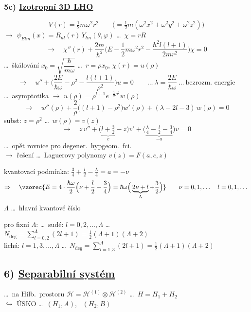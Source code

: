 \subsubsection*{5c) \underline{Izotropní 3D LHO}}
\[
  V(r) = \tfrac12 m\omega^2r^2 \qquad \big(= \tfrac12m(\omega^2x^2 + \omega^2y^2 + \omega^2z^2)\big)
\]
$\to$ \quad $\psi_{Elm}(x) = R_{nl}(r)\,Y_{lm}(\theta,\varphi)$ \quad \dots\ $\chi = rR$
\[
  \to\quad \chi''(r) + \frac{2m}{\hbar^2}\Big(E - \frac12m\omega^2r^2 - \frac{\hbar^2l(l+1)}{2mr^2}\Big)\chi = 0
\]
\quad \dots\ škálování \quad $x_0 = \sqrt{\dfrac{\hbar}{m\omega}}$ \quad \dots\ $r = \rho x_0$, \quad $\chi(r) = u(\rho)$
\[
  \to\quad u'' + \Big(\frac{2E}{\hbar\omega} - \rho^2 - \frac{l(l+1)}{\rho^2}\Big)u = 0
  \qquad\dots\ \lambda = \frac{2E}{\hbar\omega}\ \dots\ \text{bezrozm.\ energie}
\]
\quad \dots\ asymptotika \quad $\to$ \quad $u(\rho) = \rho^{l+1}e^{-\frac12\rho^2}w(\rho)$
\[
  \to\quad w''(\rho) + \frac2\rho\big((l+1) - \rho^2\big)w'(\rho) + (\lambda - 2l - 3)\,w(\rho) = 0
\]
\quad subst: \quad $z = \rho^2$ \quad \dots\ $w(\rho) = v(z)$
\[
  \to\quad z\,v'' + \big(\underbrace{l + \tfrac32}_{c} - z\big)v' + \big(\underbrace{\tfrac\lambda4 - \tfrac l2 - \tfrac34}_{-a}\big)v = 0
\]
\quad \dots\ opět rovnice pro degener.\ hypgeom.\ fci. \\
\quad\quad $\to$ řešení \dots\ Laguerovy polynomy \quad $v(z) = F(a,c,z)$

kvantovací podmínka: \quad $\frac34 + \frac l2 - \frac\lambda4 = a = -\nu$
\[
  \Rightarrow\quad \vzorec{E = 4\cdot\frac{\hbar\omega}{2}\Big(\nu + \frac l2 + \frac34\Big) = \hbar\omega\Big(\underbrace{2\nu + l}_{\Lambda} + \frac32\Big)}
  \qquad \nu = 0,1,\dots\quad l = 0,1,\dots
\]
\hspace*{7cm} $\Lambda$ \dots\ hlavní kvantové číslo

pro fixní $\Lambda$: \dots\ sudé: $l = 0,2,\dots,\Lambda$ \quad \dots\ $N_{\deg} = \sum_{l=0,2}^{\Lambda}(2l+1) = \frac12(\Lambda+1)(\Lambda+2)$ \quad {} \\
\hspace*{2.75cm} lichá: $l = 1,3,\dots,\Lambda$ \quad \dots\ $N_{\deg} = \sum_{l=1,3}^{\Lambda}(2l+1) = \frac12(\Lambda+1)(\Lambda+2)$ \quad {}

\subsection*{6) \underline{Separabilní systém}}
\dots\ na Hilb.\ prostoru \quad $\mathcal{H} = \mathcal{H}^{(1)}\otimes\mathcal{H}^{(2)}$ \quad \dots\ $H = H_1 + H_2$ \\
\hspace*{4.5cm} $\hookrightarrow$ ÚSKO \dots\ $(H_1,A)$, \ $(H_2,B)$

